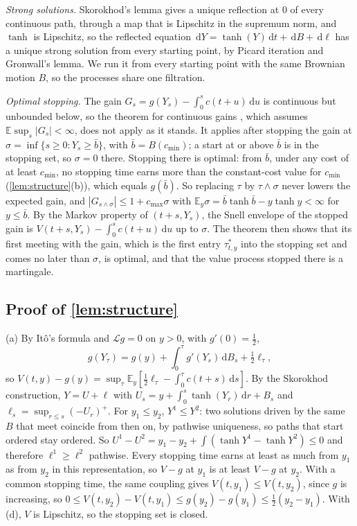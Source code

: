 \documentclass[11pt]{article}
\theoremstyle{definition}
\theoremstyle{remark}
\newcommand{\E}{\mathbb{E}}
\newcommand{\dd}{\,\mathrm{d}}
\newcommand{\Lop}{\mathcal{L}}
\begin{document}
\emph{Strong solutions.} Skorokhod's lemma \citep[Ch.~VI, Lemma~2.1]{revuz1999} gives a unique
reflection at 0 of every continuous path, through a map that is Lipschitz in the supremum norm,
and $\tanh$ is Lipschitz, so the reflected equation $\dd Y = \tanh(Y)\dd t + \dd B + \dd\ell$ has a
unique strong solution from every starting point, by Picard iteration and Gronwall's lemma. We
run it from every starting point with the same Brownian motion $B$, so the processes share one
filtration.

\emph{Optimal stopping.} The gain $G_s = g(Y_s) - \int_0^s c(t + u)\dd u$ is continuous but
unbounded below, so the theorem for continuous gains \citep[Ch.~I, Thm.~2.2]{peskir2006}, which
assumes $\E\sup_s |G_s| < \infty$, does not apply as it stands. It applies after stopping the gain
at $\sigma = \inf\{s \ge 0 : Y_s \ge \bar b\}$, with $\bar b = B(c_{\min})$; a start at or above
$\bar b$ is in the stopping set, so $\sigma = 0$ there. Stopping there is optimal: from
$\bar b$, under any cost of at least $c_{\min}$, no stopping time earns more than the constant-cost
value for $c_{\min}$ (\cref{lem:structure}(b)), which equals $g(\bar b)$. So replacing $\tau$ by
$\tau \wedge \sigma$ never lowers the expected gain, and $|G_{s \wedge \sigma}| \le 1 + c_{\max}\sigma$
with $\E_y\sigma = \bar b\tanh\bar b - y\tanh y < \infty$ for $y \le \bar b$. By the Markov property of $(t + s, Y_s)$, the Snell envelope of the
stopped gain is $V(t + s, Y_s) - \int_0^s c(t + u)\dd u$ up to $\sigma$. The theorem then shows that
its first meeting with the gain, which is the first entry $\tau^*_{t,y}$ into the stopping set and
comes no later than $\sigma$, is optimal, and that the value process stopped there is a
martingale.

\subsection{Proof of \texorpdfstring{\cref{lem:structure}}{Lemma }}

(a) By Itô's formula and $\Lop g = 0$ on $y > 0$, with $g'(0) = \tfrac12$,
\begin{equation}
  g(Y_\tau) = g(y) + \int_0^\tau g'(Y_s)\dd B_s + \tfrac12\ell_\tau,
\end{equation}
so $V(t, y) - g(y) = \sup_\tau \E_y[\tfrac12\ell_\tau - \int_0^\tau c(t+s)\dd s]$. By the
Skorokhod construction, $Y = U + \ell$ with $U_s = y + \int_0^s \tanh(Y_r)\dd r + B_s$ and
$\ell_s = \sup_{r \le s}(-U_r)^+$. For $y_1 \le y_2$, $Y^1 \le Y^2$: two solutions driven by the same $B$ that meet
coincide from then on, by pathwise uniqueness, so paths that start ordered stay ordered. So $U^1 - U^2 = y_1 - y_2 + \int(\tanh Y^1 - \tanh Y^2) \le 0$
and therefore $\ell^1 \ge \ell^2$ pathwise. Every stopping time earns at least as much from $y_1$
as from $y_2$ in this representation, so $V - g$ at $y_1$ is at least $V - g$ at $y_2$. With a
common stopping time, the same coupling gives $V(t, y_1) \le V(t, y_2)$, since $g$ is increasing,
so $0 \le V(t, y_2) - V(t, y_1) \le g(y_2) - g(y_1) \le \tfrac12(y_2 - y_1)$. With (d), $V$ is
Lipschitz, so the stopping set is closed.
\end{document}
